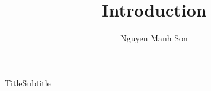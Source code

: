 \documentclass[pdf,aspectratio=169]{beamer}
\title{Introduction}
\author{Nguyen Manh Son}
\institute[] 
{
  AI - Analytical Chemistry Laboratory\\ 
  \vspace{3mm}
  VNU University of Science
}
\begin{document}
\begin{frame}
	\titlepage
\end{frame}


\begin{frame}{Title}{Subtitle}


\end{frame}
\end{document}
